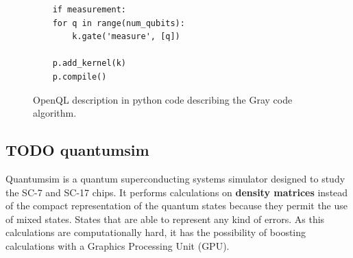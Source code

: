 \begin{itemize}
\begin{figure}
\begin{minipage}{\textwidth}
\begin{verbatim}
    if measurement:
	for q in range(num_qubits):
	    k.gate('measure', [q])

    p.add_kernel(k)
    p.compile()

\end{verbatim}

\caption{OpenQL description in python code describing the Gray code algorithm.}
\label{code:openql_gray_code}
\end{minipage}
\end{figure}
\end{itemize}

\subsection*{{\bfseries\sffamily TODO} quantumsim}
\label{sec:org72ca31c}

Quantumsim is a quantum superconducting systems simulator designed to study the SC-7 and SC-17 chips.
It performs calculations on \textbf{density matrices} instead of the compact representation of the quantum states because they permit the use of mixed states.
States that are able to represent any kind of errors.
As this calculations are computationally hard, it has the possibility of boosting calculations with a Graphics Processing Unit (GPU).



